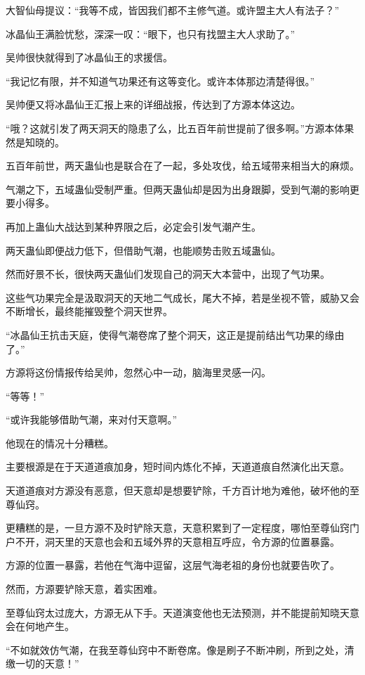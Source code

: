 \begin{this_body}
大智仙母提议：“我等不成，皆因我们都不主修气道。或许盟主大人有法子？”

冰晶仙王满脸忧愁，深深一叹：“眼下，也只有找盟主大人求助了。”

吴帅很快就得到了冰晶仙王的求援信。

“我记忆有限，并不知道气功果还有这等变化。或许本体那边清楚得很。”

吴帅便又将冰晶仙王汇报上来的详细战报，传达到了方源本体这边。

“哦？这就引发了两天洞天的隐患了么，比五百年前世提前了很多啊。”方源本体果然是知晓的。

五百年前世，两天蛊仙也是联合在了一起，多处攻伐，给五域带来相当大的麻烦。

气潮之下，五域蛊仙受制严重。但两天蛊仙却是因为出身跟脚，受到气潮的影响更要小得多。

再加上蛊仙大战达到某种界限之后，必定会引发气潮产生。

两天蛊仙即便战力低下，但借助气潮，也能顺势击败五域蛊仙。

然而好景不长，很快两天蛊仙们发现自己的洞天大本营中，出现了气功果。

这些气功果完全是汲取洞天的天地二气成长，尾大不掉，若是坐视不管，威胁又会不断增长，最终能摧毁整个洞天世界。

“冰晶仙王抗击天庭，使得气潮卷席了整个洞天，这正是提前结出气功果的缘由了。”

方源将这份情报传给吴帅，忽然心中一动，脑海里灵感一闪。

“等等！”

“或许我能够借助气潮，来对付天意啊。”

他现在的情况十分糟糕。

主要根源是在于天道道痕加身，短时间内炼化不掉，天道道痕自然演化出天意。

天道道痕对方源没有恶意，但天意却是想要铲除，千方百计地为难他，破坏他的至尊仙窍。

更糟糕的是，一旦方源不及时铲除天意，天意积累到了一定程度，哪怕至尊仙窍门户不开，洞天里的天意也会和五域外界的天意相互呼应，令方源的位置暴露。

方源的位置一暴露，若他在气海中逗留，这层气海老祖的身份也就要告吹了。

然而，方源要铲除天意，着实困难。

至尊仙窍太过庞大，方源无从下手。天道演变他也无法预测，并不能提前知晓天意会在何地产生。

“不如就效仿气潮，在我至尊仙窍中不断卷席。像是刷子不断冲刷，所到之处，清缴一切的天意！”


\end{this_body}
